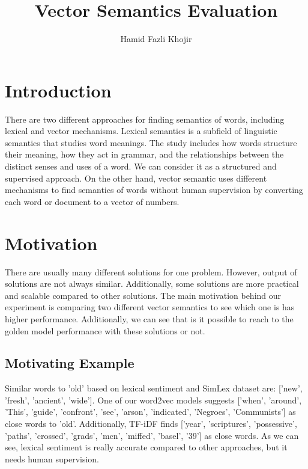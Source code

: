 \documentclass[sigconf]{acmart}
\begin{document}
\title{Vector Semantics Evaluation}
\author{Hamid Fazli Khojir}

\maketitle

\section{Introduction}
There are two different approaches for finding semantics of words, including lexical and vector mechanisms. Lexical semantics is a subfield of linguistic semantics that studies word meanings. The study includes how words structure their meaning, how they act in grammar, and the relationships between the distinct senses and uses of a word\cite{noauthor_lexical_2021}. We can consider it as a structured and supervised approach. On the other hand, vector semantic uses different mechanisms to find semantics of words without human supervision by converting each word or document to a vector of numbers.

\section{Motivation}
There are usually many different solutions for one problem. However, output of solutions are not always similar. Additionally, some solutions are more practical and scalable compared to other solutions. The main motivation behind our experiment is comparing two different vector semantics to see which one is has higher performance. Additionally, we can see that is it possible to reach to the golden model performance with these solutions or not.
\subsection{Motivating Example}
Similar words to 'old' based on lexical sentiment and SimLex dataset are: ['new', 'fresh', 'ancient', 'wide']. One of our word2vec models suggests ['when', 'around', 'This', 'guide', 'confront', 'see', 'arson', 'indicated', 'Negroes', 'Communists'] as close words to 'old'. Additionally, TF-iDF finds ['year', 'scriptures', 'possessive', 'paths', 'crossed', 'grads', 'mcn', 'miffed', 'basel', '39'] as close words. As we can see, lexical sentiment is really accurate compared to other approaches, but it needs human supervision.
\end{document}
